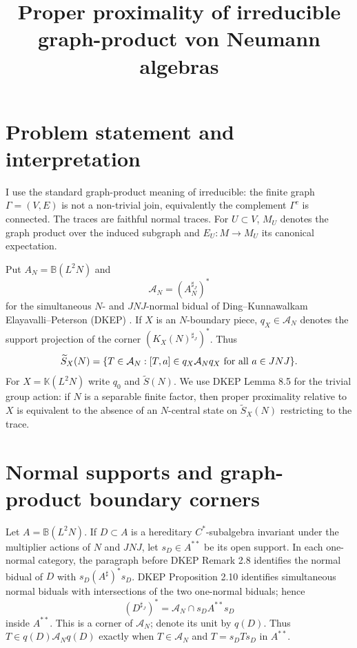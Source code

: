 \documentclass[12pt]{article}
\newcommand{\cA}{\mathcal A}
\begin{document}
\title{Proper proximality of irreducible graph-product von Neumann algebras}
\author{}
\date{}
\maketitle

\section*{Problem statement and interpretation}

I use the standard graph-product meaning of irreducible: the finite graph
\(\Gamma=(V,E)\) is not a non-trivial join, equivalently the complement
\(\Gamma^c\) is connected.  The traces are faithful normal traces.  For
\(U\subset V\), \(M_U\) denotes the graph product over the induced subgraph and
\(E_U:M\to M_U\) its canonical expectation.

Put \(A_N=\mathbb B(L^2N)\) and
\[
        \cA_N=(A_N^{\sharp_J})^*
\]
for the simultaneous \(N\)- and \(JNJ\)-normal bidual of
Ding--Kunnawalkam Elayavalli--Peterson (DKEP) \cite{DKEP}.  If \(X\) is an
\(N\)-boundary piece, \(q_X\in\cA_N\) denotes the support projection of the
corner \((K_X(N)^{\sharp_J})^*\).  Thus
\[
 \widetilde S_X(N)=
 \{T\in\cA_N:[T,a]\in q_X\cA_Nq_X\hbox{ for all }a\in JNJ\}.
\]
For \(X=\mathbb K(L^2N)\) write \(q_0\) and \(\widetilde S(N)\).  We use DKEP
Lemma 8.5 for the trivial group action: if \(N\) is a separable finite factor,
then proper proximality relative to \(X\) is equivalent to the absence of an
\(N\)-central state on \(\widetilde S_X(N)\) restricting to the trace.

\section*{Normal supports and graph-product boundary corners}

Let \(A=\mathbb B(L^2N)\).  If \(D\subset A\) is a hereditary \(C^*\)-subalgebra
invariant under the multiplier actions of \(N\) and \(JNJ\), let
\(s_D\in A^{**}\) be its open support.  In each one-normal category, the
paragraph before DKEP Remark 2.8 identifies the normal bidual of \(D\) with
\(s_D(A^\sharp)^*s_D\).  DKEP Proposition 2.10 identifies simultaneous normal
biduals with intersections of the two one-normal biduals; hence
\[
        (D^{\sharp_J})^*=\cA_N\cap s_DA^{**}s_D                  \tag{1}
\]
inside \(A^{**}\).  This is a corner of \(\cA_N\); denote its unit by \(q(D)\).
Thus \(T\in q(D)\cA_Nq(D)\) exactly when \(T\in\cA_N\) and \(T=s_DTs_D\) in
\(A^{**}\).
\end{document}
